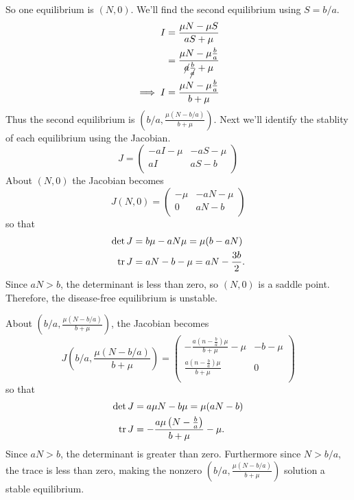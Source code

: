 \documentclass[12pt]{article}
\begin{document}
So one equilibrium is $(N,0)$. We'll find the second equilibrium using $S=b/a$.
\begin{equation*}
  \begin{aligned}
    I &= \frac{\mu N - \mu S}{aS+\mu} \\
    &= \frac{\mu N - \mu \frac{b}{a}}{\cancel{a}\frac{b}{\cancel{a}}+\mu} \\
    \implies I &= \frac{\mu N - \mu \frac{b}{a}}{b+\mu} \\
  \end{aligned}
\end{equation*}
Thus the second equilibrium is $\left(b/a,\frac{\mu(N-b/a)}{b+\mu}\right)$. Next
we'll identify the stablity of each equilibrium using the Jacobian.
\begin{equation*}
  J =
  \begin{pmatrix}
    -a I-\mu  & -a S-\mu  \\
    a I & a S-b \\
  \end{pmatrix}
\end{equation*}
About $(N,0)$ the Jacobian becomes
\begin{equation*}
  J(N,0) =
  \begin{pmatrix}
    -\mu  & -a N-\mu  \\
    0 & a N-b \\
  \end{pmatrix}
\end{equation*}
so that
\begin{equation*}
  \begin{aligned}
    \det{J} &= b \mu - a N \mu = \mu(b-aN)\\
    \operatorname{tr}{J} &= a N - b - \mu = aN-\frac{3b}{2}. \\
  \end{aligned}
\end{equation*}
Since $aN>b$, the determinant is less than zero, so $(N,0)$ is a saddle point.
Therefore, the disease-free equilibrium is unstable.

About $\left(b/a,\frac{\mu(N-b/a)}{b+\mu}\right)$, the Jacobian becomes
\begin{equation*}
  J\left(b/a,\frac{\mu(N-b/a)}{b+\mu}\right) =
  \begin{pmatrix}
    -\frac{a \left(n-\frac{b}{a}\right) \mu }{b+\mu }-\mu  & -b-\mu  \\
    \frac{a \left(n-\frac{b}{a}\right) \mu }{b+\mu } & 0 \\
  \end{pmatrix}
\end{equation*}
so that
\begin{equation*}
  \begin{aligned}
    \det{J} &= a \mu  N-b \mu = \mu(aN-b)\\
    \operatorname{tr}{J} &= -\frac{a \mu  \left(N-\frac{b}{a}\right)}{b+\mu}-\mu. \\
  \end{aligned}
\end{equation*}
Since $aN>b$, the determinant is greater than zero. Furthermore since $N>b/a$,
the trace is less than zero, making the nonzero
$\left(b/a,\frac{\mu(N-b/a)}{b+\mu}\right)$ solution a stable equilibrium.
\end{document}
